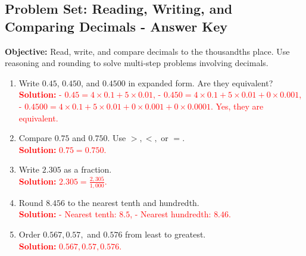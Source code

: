 \documentclass[12pt]{article}
\title{}
\date{}
\begin{document}
\subsection*{Problem Set: Reading, Writing, and Comparing Decimals - Answer Key}
\onehalfspacing

\begin{tcolorbox}[colframe=black!40, colback=gray!5, 
coltitle=black, colbacktitle=black!20, fonttitle=\bfseries\Large, 
title=Learning Objective, halign title=center, left=5pt, right=5pt, top=5pt, bottom=15pt]
\textbf{Objective:} Read, write, and compare decimals to the thousandths place. Use reasoning and rounding to solve multi-step problems involving decimals.
\end{tcolorbox}

\begin{tcolorbox}[colframe=black!60, colback=white, 
coltitle=black, colbacktitle=black!15, fonttitle=\bfseries\Large, 
title=Exercises, halign title=center, left=10pt, right=10pt, top=10pt, bottom=60pt]
\begin{enumerate}[itemsep=3em]
    \item Write \( 0.45 \), \( 0.450 \), and \( 0.4500 \) in expanded form. Are they equivalent?\\
    \textcolor{red}{\textbf{Solution:} 
    - \( 0.45 = 4 \times 0.1 + 5 \times 0.01 \), 
    - \( 0.450 = 4 \times 0.1 + 5 \times 0.01 + 0 \times 0.001 \), 
    - \( 0.4500 = 4 \times 0.1 + 5 \times 0.01 + 0 \times 0.001 + 0 \times 0.0001 \). 
    Yes, they are equivalent.}

    \item Compare \( 0.75 \) and \( 0.750 \). Use \( >, <, \) or \( = \).\\
    \textcolor{red}{\textbf{Solution:} \( 0.75 = 0.750 \).}

    \item Write \( 2.305 \) as a fraction.\\
    \textcolor{red}{\textbf{Solution:} \( 2.305 = \frac{2,305}{1,000} \).}

    \item Round \( 8.456 \) to the nearest tenth and hundredth.\\
    \textcolor{red}{\textbf{Solution:} 
    - Nearest tenth: \( 8.5 \), 
    - Nearest hundredth: \( 8.46 \).}

    \item Order \( 0.567, 0.57, \) and \( 0.576 \) from least to greatest.\\
    \textcolor{red}{\textbf{Solution:} \( 0.567, 0.57, 0.576 \).}


\end{enumerate}
\end{tcolorbox}
\end{document}
